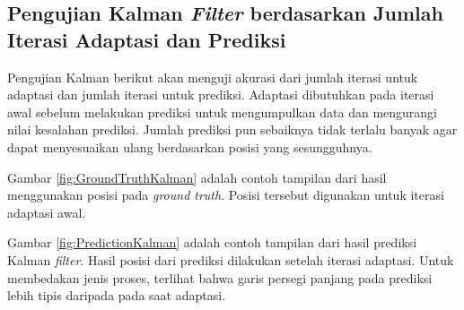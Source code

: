 \subsection{Pengujian Kalman \textit{Filter} berdasarkan Jumlah Iterasi Adaptasi dan Prediksi}
\noindent Pengujian Kalman berikut akan menguji akurasi dari jumlah iterasi untuk adaptasi dan jumlah iterasi untuk prediksi. Adaptasi dibutuhkan pada iterasi awal sebelum melakukan prediksi untuk mengumpulkan data dan mengurangi nilai kesalahan prediksi. Jumlah prediksi pun sebaiknya tidak terlalu banyak agar dapat menyesuaikan ulang berdasarkan posisi yang sesungguhnya.

\noindent Gambar \ref{fig:GroundTruthKalman} adalah contoh tampilan dari hasil menggunakan posisi pada \textit{ground truth}. Posisi tersebut digunakan untuk iterasi adaptasi awal.

\begin{adjustbox}{width=1\textwidth}
\noindent\begin{minipage}{\linewidth}
	\label{fig:GroundTruthKalman}
\end{minipage}
\end{adjustbox}

\noindent Gambar \ref{fig:PredictionKalman} adalah contoh tampilan dari hasil prediksi Kalman \textit{filter}. Hasil posisi dari prediksi dilakukan setelah iterasi adaptasi. Untuk membedakan jenis proses, terlihat bahwa garis persegi panjang pada prediksi lebih tipis daripada pada saat adaptasi.

